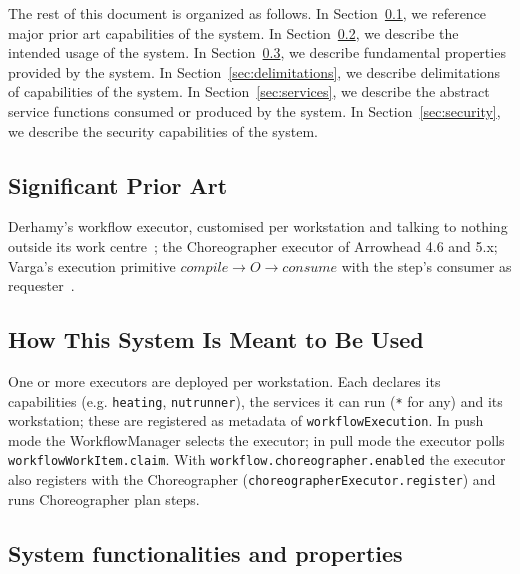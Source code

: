 \documentclass[a4paper]{arrowhead}
\begin{document}
The rest of this document is organized as follows.
In Section~\ref{sec:prior_art}, we reference major prior art capabilities of the system.
In Section~\ref{sec:use}, we describe the intended usage of the system.
In Section~\ref{sec:properties}, we describe fundamental properties provided by the system.
In Section~\ref{sec:delimitations}, we describe delimitations of capabilities of the system.
In Section~\ref{sec:services}, we describe the abstract service functions consumed or produced by the system.
In Section~\ref{sec:security}, we describe the security capabilities of the system.

\newpage
\subsection{Significant Prior Art}
\label{sec:prior_art}
Derhamy's workflow executor, customised per workstation and talking to nothing outside its work
centre~\cite{derhamy2018workflow}; the Choreographer executor of Arrowhead 4.6 and 5.x; Varga's execution primitive
$compile \rightarrow O \rightarrow consume$ with the step's consumer as requester~\cite{varga2026}.

\subsection{How This System Is Meant to Be Used}
\label{sec:use}
One or more executors are deployed per workstation. Each declares its capabilities (e.g. \texttt{heating},
\texttt{nutrunner}), the services it can run (\texttt{*} for any) and its workstation; these are registered as
metadata of \texttt{workflow\allowbreak{}Execution}. In push mode the WorkflowManager selects the executor; in pull mode the
executor polls \texttt{workflow\allowbreak{}Work\allowbreak{}Item.\allowbreak{}claim}. With \texttt{workflow.\allowbreak{}choreographer.\allowbreak{}enabled} the executor also
registers with the Choreographer (\texttt{choreographer\allowbreak{}Executor.\allowbreak{}register}) and runs Choreographer plan steps.

\subsection{System functionalities and properties}
\label{sec:properties}
\end{document}
